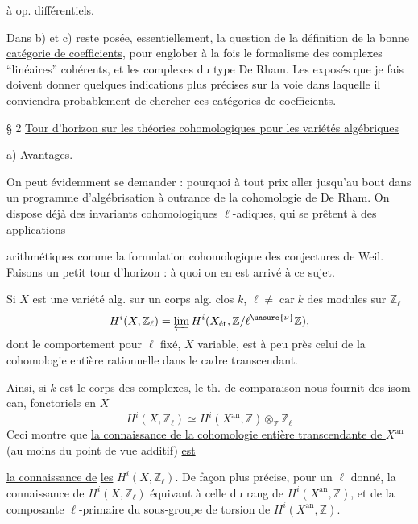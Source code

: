 à  op. différentiels.

Dans b) et c) reste posée, essentiellement, la question de la définition de la bonne \uline{catégorie de coefficients}, pour englober à la fois le formalisme des complexes  ``linéaires'' cohérents, et les complexes du type De Rham.
Les exposés que je fais doivent donner quelques indications plus précises sur la voie  dans laquelle il conviendra  probablement de chercher ces catégories de coefficients.

§ 2 \uline{Tour d'horizon sur les  théories cohomologiques  pour les variétés algébriques}

\uline{a) Avantages}. 

On peut évidemment se demander : pourquoi à tout prix  aller jusqu'au bout dans un programme d'algébrisation  à outrance de la cohomologie de De Rham.
On dispose déjà des invariants cohomologiques $\ell$-adiques, qui se prêtent à des applications 

arithmétiques comme la formulation cohomologique des conjectures de Weil.
Faisons un petit tour d'horizon : à quoi on en est arrivé à ce sujet.

Si $X$ est une variété alg. sur un corps alg. clos $k$,
\uline{$\ell\neq\operatorname{car} k$} des modules sur $\mathbb Z_\ell$
\[
H^i(X,\mathbb Z_\ell)=\varprojlim H^i(X_{\text{ét}},\mathbb Z/\ell^{\unsure{\nu}}\mathbb Z),
\]
dont le comportement pour $\ell$  fixé, $X$ variable, est à peu près celui de la cohomologie entière  rationnelle dans le cadre transcendant.

Ainsi, si $k$ est le corps des complexes, le th. de comparaison nous fournit des isom can, fonctoriels en $X$
\[
\boxed{H^i(X,\mathbb Z_\ell)\simeq H^i(X^{\mathrm{an}},\mathbb Z)\otimes_{\mathbb Z}\mathbb Z_\ell}
\]
Ceci montre que \uline{la connaissance de la cohomologie entière transcendante de $X^{\mathrm{an}}$} (au moins du point de vue additif) \uline{est}

\uline{la connaissance de}
\uline{les} $H^i(X,\mathbb Z_\ell)$.
De façon plus précise, pour un $\ell$ donné, la connaissance de $H^i(X,\mathbb Z_\ell)$ équivaut à celle du rang  de $H^i(X^{\mathrm{an}},\mathbb Z)$,  et de la composante $\ell$-primaire du sous-groupe de torsion de $H^i(X^{\mathrm{an}},\mathbb Z)$.

